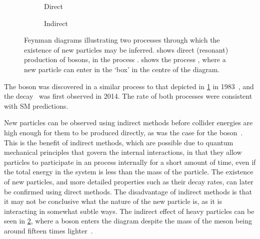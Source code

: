 \begin{figure}
  \begin{subfigure}[b]{0.4\textwidth}
    \centering
    
    \caption{Direct}
    \label{fig:intro:sm:particle_production:direct}
  \end{subfigure}
  \begin{subfigure}[b]{0.6\textwidth}
    \centering
    
    \caption{Indirect}
    \label{fig:intro:sm:particle_production:indirect}
  \end{subfigure}
  \caption{%
    Feynman diagrams illustrating two processes through which the existence of 
    new particles may be inferred.
     shows direct (resonant) 
    production of \PZ bosons, in the process 
    \decay{\Pelectron\APelectron}{\Pmuon\APmuon}.
     shows the process 
    \BsTomumu, where a new particle can enter in the `box' in the centre of the 
    diagram.
  }
  \label{fig:intro:sm:particle_production}
\end{figure}

The \PZ boson was discovered in a similar process to that depicted in 
\cref{fig:intro:sm:particle_production:direct} in 
1983~\cite{1983398,BAGNAIA1983130}, and the decay \BsTomumu\ was first observed 
in 2014.
The rate of both processes were consistent with \ac{SM} predictions.

New particles can be observed using indirect methods before collider energies 
are high enough for them to be produced directly, as was the case for the \PZ 
boson~\cite{HASERT1973138}.
This is the benefit of indirect methods, which are possible due to quantum 
mechanical principles that govern the internal interactions, in that they allow 
particles to participate in an process internally for a short amount of time, 
even if the total energy in the system is less than the mass of the particle.
The existence of new particles, and more detailed properties such as their 
decay rates, can later be confirmed using direct methods.
The disadvantage of indirect methods is that it may not be conclusive what the 
nature of the new particle is, as it is interacting in somewhat subtle ways.
The indirect effect of heavy particles can be seen in 
\cref{fig:intro:sm:particle_production:indirect}, where a \PW boson enters the 
diagram despite the mass of the \PBs meson being around fifteen times 
lighter~\cite{PDG2014}.

